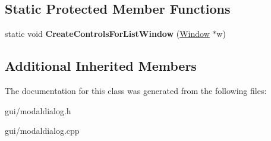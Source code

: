 \subsection*{Static Protected Member Functions}
\begin{DoxyCompactItemize}
\item 
static void {\bfseries Create\+Controls\+For\+List\+Window} (\hyperlink{classWindow}{Window} $\ast$w)\hypertarget{classListQuestionDialog_af408728623403001fb142bd7d0a611ad}{}\label{classListQuestionDialog_af408728623403001fb142bd7d0a611ad}

\end{DoxyCompactItemize}
\subsection*{Additional Inherited Members}


The documentation for this class was generated from the following files\+:\begin{DoxyCompactItemize}
\item 
gui/modaldialog.\+h\item 
gui/modaldialog.\+cpp\end{DoxyCompactItemize}
